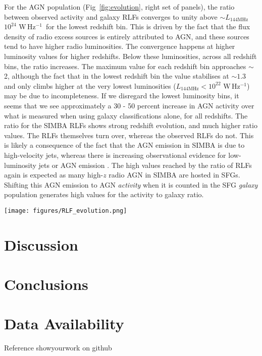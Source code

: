 \documentclass[usenatbib,fleqn,letters]{mnras}
\newcommand{\wphz}{$\,$W$\,$Hz$^{-1}$}
\newcommand{\llof}{$L_{\textrm{144MHz}}$}
\begin{document}
For the AGN population (Fig~\ref{fig:evolution}, right set of panels), the ratio between observed activity and galaxy RLFs converges to unity above $\sim$\llof $10^{24}\,$\wphz\ for the lowest redshift bin. This is driven by the fact that the flux density of radio excess sources is entirely attributed to AGN, and these sources tend to have higher radio luminosities. The convergence happens at higher luminosity values for higher redshifts. Below these luminosities, across all redshift bins, the ratio increases. The maximum value for each redshift bin approaches $\sim$2, although the fact that in the lowest redshift bin the value stabilises at $\sim1.3$ and only climbs higher at the very lowest luminosities (\llof $<10^{22}\,$\wphz ) may be due to incompleteness. If we disregard the lowest luminosity bins, it seems that we see approximately a 30 - 50 percent increase in AGN activity over what is measured when using galaxy classifications alone, for all redshifts. The ratio for the SIMBA RLFs shows strong redshift evolution, and much higher ratio values. The RLFs themselves turn over, whereas the observed RLFs do not. This is likely a consequence of the fact that the AGN emission in SIMBA is due to high-velocity jets, whereas there is increasing observational evidence for low-luminosity jets or AGN emission \citep{macfarlane_radio_2021,yue_novel_2024}. The high values reached by the ratio of RLFs again is expected as many high-$z$ radio AGN in SIMBA are hosted in SFGs. Shifting this AGN emission to AGN \textit{activity} when it is counted in the SFG \textit{galaxy} population generates high values for the activity to galaxy ratio. 


\begin{figure*}
    \centering
    \texttt{[image: figures/RLF\_evolution.png]}
    \caption{Caption}
    \label{fig:evolution}
\end{figure*}


\section{Discussion}

\section{Conclusions}


\section*{Data Availability}
Reference showyourwork on github
\end{document}
